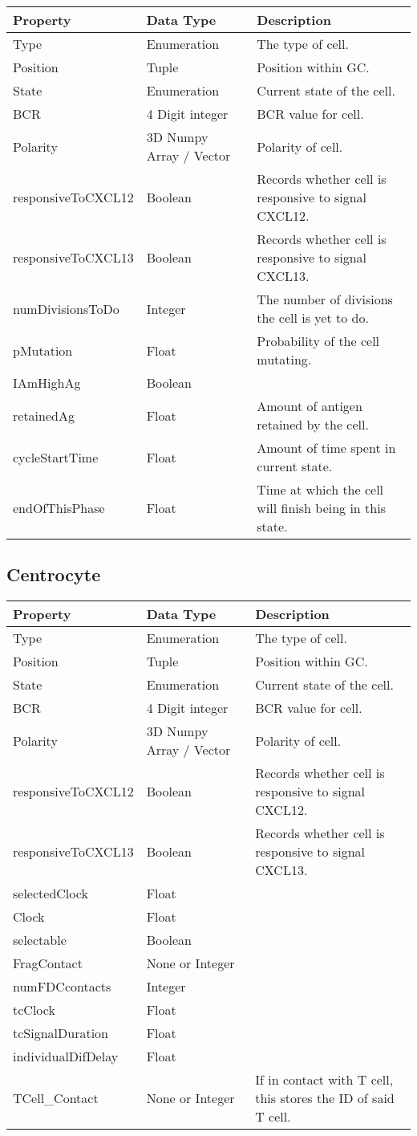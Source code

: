 \documentclass[english]{article}
\begin{document}
\begin{center}
\begin{tabular}{|C{2.1in}|C{2.1in}|C{2.1in}|}

\hline
\textbf{Property} & \textbf{Data Type} & \textbf{Description}
\tabularnewline
\hline
\hline
Type & Enumeration & The type of cell. 
\tabularnewline
\hline
Position & Tuple & Position within GC.
\tabularnewline
\hline
State & Enumeration & Current state of the cell. 
\tabularnewline
\hline
BCR & 4 Digit integer & BCR value for cell.
\tabularnewline
\hline
Polarity & 3D Numpy Array / Vector & Polarity of cell.
\tabularnewline
\hline
responsiveToCXCL12 & Boolean & Records whether cell is responsive to signal CXCL12.
\tabularnewline
\hline
responsiveToCXCL13 & Boolean & Records whether cell is responsive to signal CXCL13.
\tabularnewline
\hline
numDivisionsToDo & Integer & The number of divisions the cell is yet to do. 
\tabularnewline
\hline 
pMutation & Float & Probability of the cell mutating. 
\tabularnewline
\hline
IAmHighAg & Boolean & 
\tabularnewline
\hline
retainedAg & Float & Amount of antigen retained by the cell. 
\tabularnewline
\hline
cycleStartTime & Float & Amount of time spent in current state. 
\tabularnewline
\hline
endOfThisPhase & Float & Time at which the cell will finish being in this state. 
\tabularnewline
\hline

\end{tabular}
\end{center}


\subsection{Centrocyte}

\begin{center}
\begin{tabular}{|C{2.1in}|C{2.1in}|C{2.1in}|}

\hline
\textbf{Property} & \textbf{Data Type} & \textbf{Description}
\tabularnewline
\hline
\hline
Type & Enumeration & The type of cell. 
\tabularnewline
\hline
Position & Tuple & Position within GC.
\tabularnewline
\hline
State & Enumeration & Current state of the cell. 
\tabularnewline
\hline
BCR & 4 Digit integer & BCR value for cell.
\tabularnewline
\hline
Polarity & 3D Numpy Array / Vector & Polarity of cell.
\tabularnewline
\hline
responsiveToCXCL12 & Boolean & Records whether cell is responsive to signal CXCL12.
\tabularnewline
\hline
responsiveToCXCL13 & Boolean & Records whether cell is responsive to signal CXCL13.
\tabularnewline
\hline
selectedClock & Float &
\tabularnewline
\hline
Clock & Float &
\tabularnewline
\hline
selectable & Boolean &
\tabularnewline
\hline
FragContact & None or Integer & 
\tabularnewline
\hline
numFDCcontacts & Integer &
\tabularnewline
\hline
tcClock & Float &
\tabularnewline
\hline
tcSignalDuration & Float &
\tabularnewline
\hline
individualDifDelay & Float &
\tabularnewline
\hline
TCell\_Contact & None or Integer & If in contact with T cell, this stores the ID of said T cell. 
\tabularnewline
\hline
\end{tabular}
\end{center}
\end{document}
